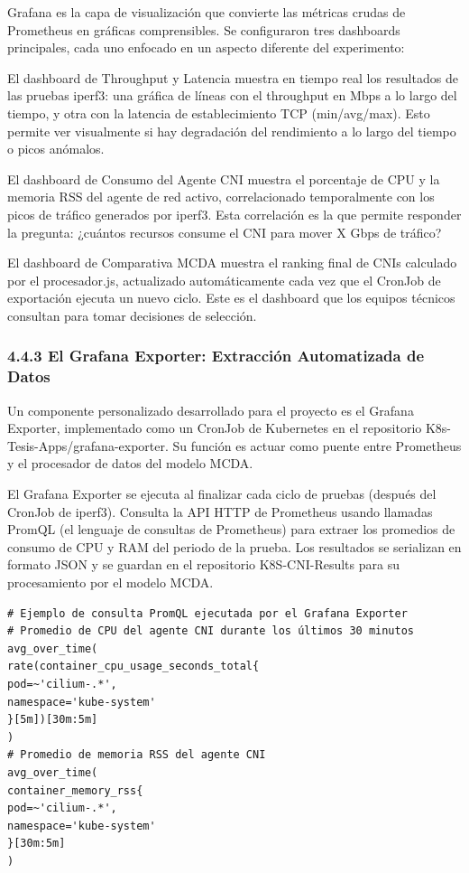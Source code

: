 \documentclass[journal]{IEEEtran}
\begin{document}
Grafana es la capa de visualización que convierte las métricas crudas de Prometheus en gráficas comprensibles. Se configuraron tres dashboards principales, cada uno enfocado en un aspecto diferente del experimento:

El dashboard de Throughput y Latencia muestra en tiempo real los resultados de las pruebas iperf3: una gráfica de líneas con el throughput en Mbps a lo largo del tiempo, y otra con la latencia de establecimiento TCP (min/avg/max). Esto permite ver visualmente si hay degradación del rendimiento a lo largo del tiempo o picos anómalos.

El dashboard de Consumo del Agente CNI muestra el porcentaje de CPU y la memoria RSS del agente de red activo, correlacionado temporalmente con los picos de tráfico generados por iperf3. Esta correlación es la que permite responder la pregunta: ¿cuántos recursos consume el CNI para mover X Gbps de tráfico?

El dashboard de Comparativa MCDA muestra el ranking final de CNIs calculado por el procesador.js, actualizado automáticamente cada vez que el CronJob de exportación ejecuta un nuevo ciclo. Este es el dashboard que los equipos técnicos consultan para tomar decisiones de selección.

\subsubsection{4.4.3 El Grafana Exporter: Extracción Automatizada de Datos}

Un componente personalizado desarrollado para el proyecto es el Grafana Exporter, implementado como un CronJob de Kubernetes en el repositorio K8s-Tesis-Apps/grafana-exporter. Su función es actuar como puente entre Prometheus y el procesador de datos del modelo MCDA.

El Grafana Exporter se ejecuta al finalizar cada ciclo de pruebas (después del CronJob de iperf3). Consulta la API HTTP de Prometheus usando llamadas PromQL (el lenguaje de consultas de Prometheus) para extraer los promedios de consumo de CPU y RAM del periodo de la prueba. Los resultados se serializan en formato JSON y se guardan en el repositorio K8S-CNI-Results para su procesamiento por el modelo MCDA.

\begin{lstlisting}[basicstyle=\ttfamily\scriptsize,breaklines=true]
# Ejemplo de consulta PromQL ejecutada por el Grafana Exporter
# Promedio de CPU del agente CNI durante los últimos 30 minutos
avg_over_time(
rate(container_cpu_usage_seconds_total{
pod=~'cilium-.*',
namespace='kube-system'
}[5m])[30m:5m]
)
# Promedio de memoria RSS del agente CNI
avg_over_time(
container_memory_rss{
pod=~'cilium-.*',
namespace='kube-system'
}[30m:5m]
)
\end{lstlisting}
\end{document}

